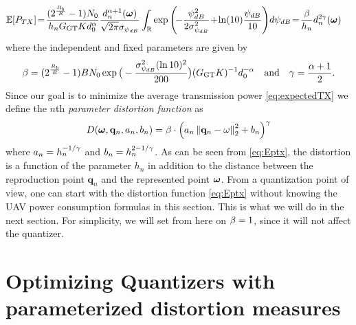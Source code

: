 \documentclass[12pt,onecolumn,journal,draftclsnofoot,letterpaper]{IEEEtran}
\renewcommand{\vq}{\mathbf p}
\renewcommand{\vp}{\mathbf q}
\newcommand{\Rb}{\ensuremath{R_b}}         %
\newcommand{\GGT}{\ensuremath{G_{\text{GT}}}}         %
\begin{document}
%
\begin{align}
\Expect{P_{TX}}&\! =\!
  \frac{(2^{\frac{\Rb}{B}}-1)N_0 }{ h_n \GGT Kd^{\alpha}_0}
  \frac{d_n^{\alpha+1}(\vome)}{\sqrt{2\pi}\sigma_{\psi_{dB}}} \int_{\R}
     \exp\left(\!-\frac{\psi^2_{dB}}{2\sigma^2_{\psi_{dB}}} \!+\! \ln(10) \frac{\psi_{dB}}{10}\right)\!d\psi_{dB}
     \!=\!\frac{\bet}{h_n}  d_n^{2\gam}(\vome)\label{eq:expectedTX} %
\end{align}
%
where the independent and fixed parameters are given by
%
\begin{align}
  \bet=(2^{\frac{\Rb}{B}}-1)B N_0 \exp\big(-\frac{\sig_{\psi_{dB}}^2 (\ln 10)^2}{200}\big)(\GGT K)^{-1}
  d_0^{-\alp}\quad\text{and}\quad
  \gam=\frac{\alp+1}{2}.
\end{align}
%
Since our goal is to minimize the average transmission power \eqref{eq:expectedTX} we define 
the $n$th \emph{parameter distortion function} as
%
\begin{align}
  D(\vome,\vp_n,a_n,b_n)=\bet\cdot  \left(a_n\Norm{\vp_n-\ome}_2^2+b_n\right)^\gam
  \label{eq:Eptx}
\end{align}
%
where $a_n=h_n^{-1/\gamma}$ and $b_n=h_n^{2-1/\gamma}$.  As can be seen from \eqref{eq:Eptx}, the distortion is a function
of the parameter $h_n$ in addition to the distance between the reproduction point $\vp_n$ and the represented point
$\boldsymbol{ \omega}$. From a quantization point of view, one can start with the distortion function \eqref{eq:Eptx} without knowing the UAV
power consumption formulas in this section. This is what we will do in the next section.  For simplicity, we will set
from here on $\beta=1$, since it will not affect the quantizer. 


\section{Optimizing Quantizers with parameterized distortion measures}\label{sec:optmize1D}
\end{document}

